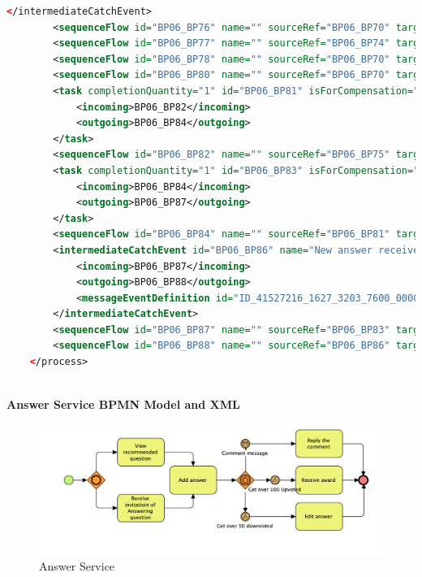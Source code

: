 \documentclass[runningheads]{llncs}
\begin{document}
\begin{lstlisting}[language={XML}]
		</intermediateCatchEvent>
		<sequenceFlow id="BP06_BP76" name="" sourceRef="BP06_BP70" targetRef="BP06_BP74"/>
		<sequenceFlow id="BP06_BP77" name="" sourceRef="BP06_BP74" targetRef="BP06_BP60"/>
		<sequenceFlow id="BP06_BP78" name="" sourceRef="BP06_BP70" targetRef="BP06_BP72"/>
		<sequenceFlow id="BP06_BP80" name="" sourceRef="BP06_BP70" targetRef="BP06_BP75"/>
		<task completionQuantity="1" id="BP06_BP81" isForCompensation="false" name="Edit Question">
			<incoming>BP06_BP82</incoming>
			<outgoing>BP06_BP84</outgoing>
		</task>
		<sequenceFlow id="BP06_BP82" name="" sourceRef="BP06_BP75" targetRef="BP06_BP81"/>
		<task completionQuantity="1" id="BP06_BP83" isForCompensation="false" name="Follow Question">
			<incoming>BP06_BP84</incoming>
			<outgoing>BP06_BP87</outgoing>
		</task>
		<sequenceFlow id="BP06_BP84" name="" sourceRef="BP06_BP81" targetRef="BP06_BP83"/>
		<intermediateCatchEvent id="BP06_BP86" name="New answer received">
			<incoming>BP06_BP87</incoming>
			<outgoing>BP06_BP88</outgoing>
			<messageEventDefinition id="ID_41527216_1627_3203_7600_000000200064"/>
		</intermediateCatchEvent>
		<sequenceFlow id="BP06_BP87" name="" sourceRef="BP06_BP83" targetRef="BP06_BP86"/>
		<sequenceFlow id="BP06_BP88" name="" sourceRef="BP06_BP86" targetRef="BP06_BP37"/>
	</process>
    
	\end{lstlisting}
	\clearpage
	\textbf{Answer Service BPMN Model and XML}\\
	\begin{figure}
		\centering %
		\includegraphics[width=1.0\textwidth]{figure/mwzh/answerservice} %
		\caption{Answer Service} %
		\label{answerservice} %
	\end{figure}
\end{document}
